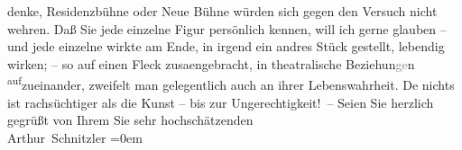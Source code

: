 \begin{ledgroupsized}[t]{13cm}
               denke, Residenzbühne oder Neue Bühne würden sich gegen den Versuch nicht wehren. Daß Sie
               jede einzelne Figur persönlich kennen, {\pb}will ich gerne
               glauben – und jede einzelne wirkte am Ende, in irgend ein andres Stück gestellt,
               lebendig wirken; – so auf einen Fleck zusa{\geminationm}engebracht,
               in theatralische Beziehun\textcolor{gray}{ge}n \substVorne{}\textsuperscript{auf}\substDazwischen{}zu\substHinten{}einander, zweifelt man gelegentlich auch an ihrer Lebenswahrheit. De{\geminationn} nichts ist rachsüchtiger als die Kunst – bis zur
               Ungerechtigkeit! –\pend
           \pstart
           Seien Sie herzlich gegrüßt von Ihrem Sie sehr hochschätzenden{\\[\baselineskip]}\spacefill\mbox{Arthur Schnitzler}\pend
           \leftskip=0em{}
         
         \endnumbering{}\end{ledgroupsized}  \newcommand{\dateiname}{L02213}\newcommand{\titel}{Arthur Schnitzler an Robert Adam, 11. 7. 1915}\newcommand{\editorInnen}{Martin Anton Müller und Gerd-Hermann Susen}
      
